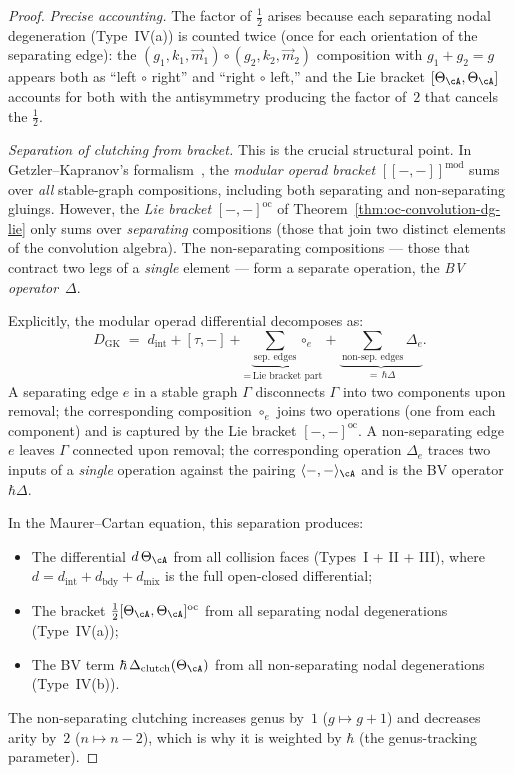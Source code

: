\begin{proof}
\emph{Precise accounting.}
The factor of $\frac{1}{2}$ arises because each separating
nodal degeneration (Type~IV(a)) is counted twice (once for
each orientation of the separating edge): the
$(g_1, k_1, \vec{m}_1)
\circ (g_2, k_2, \vec{m}_2)$ composition with
$g_1 + g_2 = g$ appears both as ``left $\circ$ right'' and
``right $\circ$ left,'' and the Lie bracket
$[\Theta_\cA, \Theta_\cA]$ accounts for both with the
antisymmetry producing the factor of~$2$ that cancels the
$\frac{1}{2}$.

\emph{Separation of clutching from bracket.}
This is the crucial structural point.  In
Getzler--Kapranov's formalism~\cite[\S5]{GeK98}, the
\emph{modular operad bracket} $[\![-,-]\!]^{\mathrm{mod}}$ sums
over \emph{all} stable-graph compositions, including both
separating and non-separating gluings.  However, the
\emph{Lie bracket} $[-,-]^{\mathrm{oc}}$ of
Theorem~\ref{thm:oc-convolution-dg-lie} only sums over
\emph{separating} compositions (those that join two distinct
elements of the convolution algebra).  The non-separating
compositions --- those that contract two legs of a
\emph{single} element --- form a separate operation, the
\emph{BV operator}~$\Delta$.

Explicitly, the modular operad differential decomposes as:
\begin{equation}\label{eq:gk-decomposition}
D_{\mathrm{GK}}
\;=\;
d_{\mathrm{int}}
+ [\tau, -]
+ \underbrace{\sum_{\text{sep.\ edges}} \circ_e}_{=\,
  \text{Lie bracket part}}
+ \underbrace{\sum_{\text{non-sep.\ edges}}
  \Delta_e}_{=\, \hbar\Delta}.
\end{equation}
A separating edge $e$ in a stable graph $\Gamma$
disconnects $\Gamma$ into two components upon removal;
the corresponding composition $\circ_e$ joins two
operations (one from each component) and is captured by the
Lie bracket $[-,-]^{\mathrm{oc}}$.  A non-separating edge
$e$ leaves $\Gamma$ connected upon removal; the
corresponding operation $\Delta_e$ traces two inputs of a
\emph{single} operation against the pairing
$\langle -, - \rangle_\cA$ and is the BV
operator~$\hbar\Delta$.

In the Maurer--Cartan equation, this separation produces:
\begin{itemize}
\item The differential $d\,\Theta_\cA$ from all collision
  faces (Types~I + II + III), where $d = d_{\mathrm{int}}
  + d_{\mathrm{bdy}} + d_{\mathrm{mix}}$ is the full
  open-closed differential;
\item The bracket $\frac{1}{2}[\Theta_\cA, \Theta_\cA]^{\mathrm{oc}}$
  from all separating nodal degenerations (Type~IV(a));
\item The BV term $\hbar\,\Delta_{\mathrm{clutch}}(\Theta_\cA)$
  from all non-separating nodal degenerations (Type~IV(b)).
\end{itemize}
The non-separating clutching increases genus by~$1$
($g \mapsto g + 1$) and decreases arity by~$2$
($n \mapsto n - 2$), which is why it is weighted by $\hbar$
(the genus-tracking parameter).


\end{proof}
